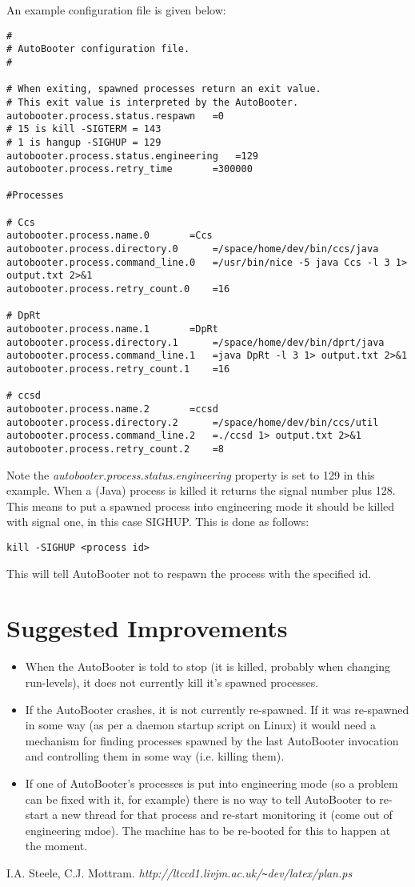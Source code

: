 \documentclass[10pt,a4paper]{article}
\begin{document}
An example configuration file is given below:
\begin{verbatim}
#
# AutoBooter configuration file.
#

# When exiting, spawned processes return an exit value.
# This exit value is interpreted by the AutoBooter.
autobooter.process.status.respawn	=0
# 15 is kill -SIGTERM = 143
# 1 is hangup -SIGHUP = 129
autobooter.process.status.engineering	=129
autobooter.process.retry_time		=300000

#Processes

# Ccs
autobooter.process.name.0		=Ccs
autobooter.process.directory.0		=/space/home/dev/bin/ccs/java
autobooter.process.command_line.0	=/usr/bin/nice -5 java Ccs -l 3 1> output.txt 2>&1
autobooter.process.retry_count.0	=16

# DpRt
autobooter.process.name.1		=DpRt
autobooter.process.directory.1		=/space/home/dev/bin/dprt/java
autobooter.process.command_line.1	=java DpRt -l 3 1> output.txt 2>&1
autobooter.process.retry_count.1	=16

# ccsd
autobooter.process.name.2		=ccsd
autobooter.process.directory.2		=/space/home/dev/bin/ccs/util
autobooter.process.command_line.2	=./ccsd 1> output.txt 2>&1
autobooter.process.retry_count.2	=8
\end{verbatim}

Note the {\em autobooter.process.status.engineering} property is set to 129 in this example. When a (Java)
process is killed it returns the signal number plus 128. This means to put a spawned process into 
engineering mode it should be killed with signal one, in this case SIGHUP. This is done as follows:
\begin{verbatim}
kill -SIGHUP <process id>
\end{verbatim}
This will tell AutoBooter not to respawn the process with the specified id.

\section{Suggested Improvements}
\begin{itemize}
\item When the AutoBooter is told to stop (it is killed, probably when changing run-levels),
	it does not currently kill it's spawned processes.
\item If the AutoBooter crashes, it is not currently re-spawned. If it was re-spawned in some way
	(as per a daemon startup script on Linux) it would need a mechanism for finding processes
	spawned by the last AutoBooter invocation and controlling them in some way (i.e. killing them). 
\item If one of AutoBooter's processes is put into engineering mode (so a problem can be fixed with it,
	for example) there is no way to tell AutoBooter to re-start a new thread for that process and
	re-start monitoring it (come out of engineering mdoe). The machine has to be re-booted for
	this to happen at the moment.
\end{itemize}

\begin{thebibliography}{99}
I.A. Steele, C.J. Mottram. {\em http://ltccd1.livjm.ac.uk/\verb'~'dev/latex/plan.ps}
\end{thebibliography}
\end{document}

